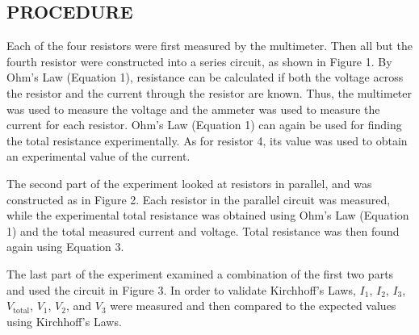 \documentclass [12pt, letterpaper, twoside] {article}
\begin{document}
\subsection* {PROCEDURE}
Each of the four resistors were first measured by the multimeter. Then all but the fourth resistor were constructed into a series circuit, as shown in Figure 1. By Ohm's Law (Equation 1), resistance can be calculated if both the voltage across the resistor and the current through the resistor are known. Thus, the multimeter was used to measure the voltage and the ammeter was used to measure the current for each resistor. Ohm's Law (Equation 1) can again be used for finding the total resistance experimentally. As for resistor 4, its value was used to obtain an experimental value of the current.

\begin{figure}
  \centering
  \qquad
  \qquad
\end{figure}

The second part of the experiment looked at resistors in parallel, and was constructed as in Figure 2. Each resistor in the parallel circuit was measured, while the experimental total resistance was obtained using Ohm's Law (Equation 1) and the total measured current and voltage. Total resistance was then found again using Equation 3.

The last part of the experiment examined a combination of the first two parts and used the circuit in Figure 3. In order to validate Kirchhoff's Laws, \(I_{1}\), \(I_{2}\), \(I_{3}\), \(V_{\text{total}}\), \(V_{1}\), \(V_{2}\), and \(V_{3}\) were measured and then compared to the expected values using Kirchhoff's Laws. 
    
\end{document}
